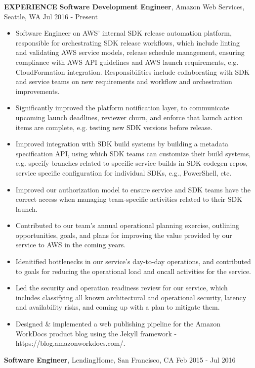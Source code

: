 \documentclass[10pt, letterpaper]{article}
\begin{document}
\textbf{EXPERIENCE}
\smallskip
\newline
\textbf{Software Development Engineer}, Amazon Web Services, Seattle, WA \hfill Jul 2016 - Present
\begin{itemize}
\item Software Engineer on AWS' internal SDK release automation platform, responsible for orchestrating SDK release workflows, which include linting and validating AWS service models, release schedule management, ensuring compliance with AWS API guidelines and AWS launch requirements, e.g. CloudFormation integration. Responsibilities include collaborating with SDK and service teams on new requirements and workflow and orchestration improvements.
\item Significantly improved the platform notification layer, to communicate upcoming launch deadlines, reviewer churn, and enforce that launch action items are complete, e.g. testing new SDK versions before release. 
\item Improved integration with SDK build systems by building a metadata specification API, using which SDK teams can customize their build systems, e.g. specify branches related to specific service builds in SDK codegen repos, service specific configuration for individual SDKs, e.g., PowerShell, etc.
\item Improved our authorization model to ensure service and SDK teams have the correct access when managing team-specific activities related to their SDK launch.
\item Contributed to our team's annual operational planning exercise, outlining opportunities, goals, and plans for improving the value provided by our service to AWS in the coming years.
\item Idenitified bottlenecks in our service's day-to-day operations, and contributed to goals for reducing the operational load and oncall activities for the service.
\item Led the security and operation readiness review for our service, which includes classifying all known architectural and operational security, latency and availability risks, and coming up with a plan to mitigate them. 
\item Designed \& implemented a web publishing pipeline for the Amazon WorkDocs product blog using the Jekyll framework - https://blog.amazonworkdocs.com/.
\end{itemize}
\textbf{Software Engineer}, LendingHome, San Francisco, CA \hfill Feb 2015 - Jul 2016
\end{document}
